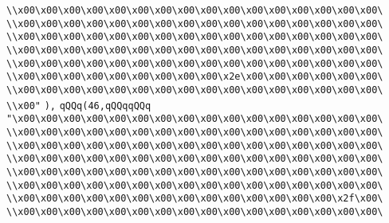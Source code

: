 \verb|\\x00\x00\x00\x00\x00\x00\x00\x00\x00\x00\x00\x00\x00\x00\x00\x00\|\newline
\verb|\\x00\x00\x00\x00\x00\x00\x00\x00\x00\x00\x00\x00\x00\x00\x00\x00\|\newline
\verb|\\x00\x00\x00\x00\x00\x00\x00\x00\x00\x00\x00\x00\x00\x00\x00\x00\|\newline
\verb|\\x00\x00\x00\x00\x00\x00\x00\x00\x00\x00\x00\x00\x00\x00\x00\x00\|\newline
\verb|\\x00\x00\x00\x00\x00\x00\x00\x00\x00\x00\x00\x00\x00\x00\x00\x00\|\newline
\verb|\\x00\x00\x00\x00\x00\x00\x00\x00\x00\x2e\x00\x00\x00\x00\x00\x00\|\newline
\verb|\\x00\x00\x00\x00\x00\x00\x00\x00\x00\x00\x00\x00\x00\x00\x00\x00\|\newline
\verb|\\x00"|\newline
\verb|),|\newline
\verb|qQQq(46,qQQqqQQq|\newline
\verb|"\x00\x00\x00\x00\x00\x00\x00\x00\x00\x00\x00\x00\x00\x00\x00\x00\|\newline
\verb|\\x00\x00\x00\x00\x00\x00\x00\x00\x00\x00\x00\x00\x00\x00\x00\x00\|\newline
\verb|\\x00\x00\x00\x00\x00\x00\x00\x00\x00\x00\x00\x00\x00\x00\x00\x00\|\newline
\verb|\\x00\x00\x00\x00\x00\x00\x00\x00\x00\x00\x00\x00\x00\x00\x00\x00\|\newline
\verb|\\x00\x00\x00\x00\x00\x00\x00\x00\x00\x00\x00\x00\x00\x00\x00\x00\|\newline
\verb|\\x00\x00\x00\x00\x00\x00\x00\x00\x00\x00\x00\x00\x00\x00\x00\x00\|\newline
\verb|\\x00\x00\x00\x00\x00\x00\x00\x00\x00\x00\x00\x00\x00\x00\x2f\x00\|\newline
\verb|\\x00\x00\x00\x00\x00\x00\x00\x00\x00\x00\x00\x00\x00\x00\x00\x00\|\newline

